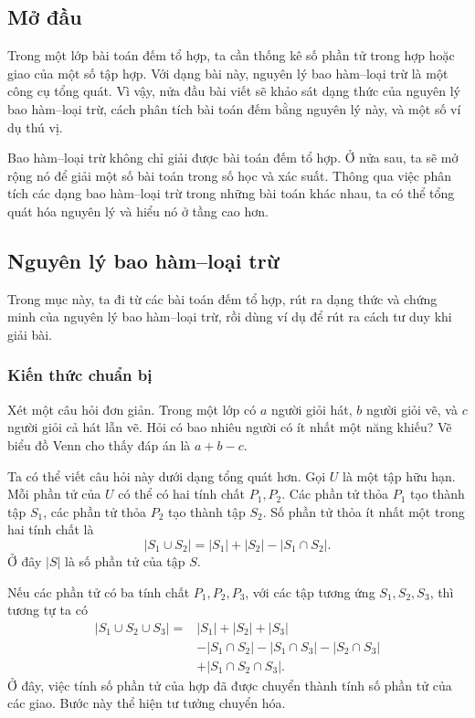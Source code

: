 \documentclass[11pt]{article}
\begin{document}
\subsection{Mở đầu}

Trong một lớp bài toán đếm tổ hợp, ta cần thống kê số phần tử trong hợp hoặc
giao của một số tập hợp. Với dạng bài này, nguyên lý bao hàm--loại trừ là một
công cụ tổng quát. Vì vậy, nửa đầu bài viết sẽ khảo sát dạng thức của nguyên
lý bao hàm--loại trừ, cách phân tích bài toán đếm bằng nguyên lý này, và một
số ví dụ thú vị.

Bao hàm--loại trừ không chỉ giải được bài toán đếm tổ hợp. Ở nửa sau, ta sẽ
mở rộng nó để giải một số bài toán trong số học và xác suất. Thông qua việc
phân tích các dạng bao hàm--loại trừ trong những bài toán khác nhau, ta có thể
tổng quát hóa nguyên lý và hiểu nó ở tầng cao hơn.

\subsection{Nguyên lý bao hàm--loại trừ}

Trong mục này, ta đi từ các bài toán đếm tổ hợp, rút ra dạng thức và chứng
minh của nguyên lý bao hàm--loại trừ, rồi dùng ví dụ để rút ra cách tư duy khi
giải bài.

\subsubsection{Kiến thức chuẩn bị}

Xét một câu hỏi đơn giản. Trong một lớp có \(a\) người giỏi hát, \(b\) người
giỏi vẽ, và \(c\) người giỏi cả hát lẫn vẽ. Hỏi có bao nhiêu người có ít nhất
một năng khiếu? Vẽ biểu đồ Venn cho thấy đáp án là \(a+b-c\).

Ta có thể viết câu hỏi này dưới dạng tổng quát hơn. Gọi \(U\) là một tập hữu
hạn. Mỗi phần tử của \(U\) có thể có hai tính chất \(P_1,P_2\). Các phần tử
thỏa \(P_1\) tạo thành tập \(S_1\), các phần tử thỏa \(P_2\) tạo thành tập
\(S_2\). Số phần tử thỏa ít nhất một trong hai tính chất là
\[
  |S_1\cup S_2|=|S_1|+|S_2|-|S_1\cap S_2|.
\]
Ở đây \(|S|\) là số phần tử của tập \(S\).

Nếu các phần tử có ba tính chất \(P_1,P_2,P_3\), với các tập tương ứng
\(S_1,S_2,S_3\), thì tương tự ta có
\[
\begin{aligned}
|S_1\cup S_2\cup S_3|
={}& |S_1|+|S_2|+|S_3|\\
&-|S_1\cap S_2|-|S_1\cap S_3|-|S_2\cap S_3|\\
&+|S_1\cap S_2\cap S_3|.
\end{aligned}
\]
Ở đây, việc tính số phần tử của hợp đã được chuyển thành tính số phần tử của
các giao. Bước này thể hiện tư tưởng chuyển hóa.
\end{document}
